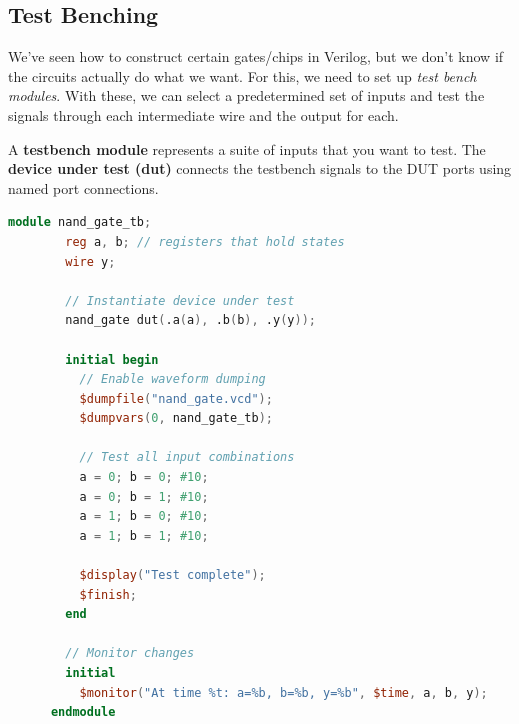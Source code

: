 \subsection{Test Benching}

  We've seen how to construct certain gates/chips in Verilog, but we don't know if the circuits actually do what we want. For this, we need to set up \textit{test bench modules}. With these, we can select a predetermined set of inputs and test the signals through each intermediate wire and the output for each. 

  \begin{definition}
    A \textbf{testbench module} represents a suite of inputs that you want to test. The \textbf{device under test (dut)} connects the testbench signals to the DUT ports using named port connections. 

    \begin{lstlisting}[language=Verilog]
      module nand_gate_tb;
        reg a, b; // registers that hold states
        wire y;

        // Instantiate device under test
        nand_gate dut(.a(a), .b(b), .y(y));

        initial begin
          // Enable waveform dumping
          $dumpfile("nand_gate.vcd");
          $dumpvars(0, nand_gate_tb);

          // Test all input combinations
          a = 0; b = 0; #10;
          a = 0; b = 1; #10;
          a = 1; b = 0; #10;
          a = 1; b = 1; #10;

          $display("Test complete");
          $finish;
        end

        // Monitor changes
        initial
          $monitor("At time %t: a=%b, b=%b, y=%b", $time, a, b, y);
      endmodule
    \end{lstlisting}
  \end{definition}

